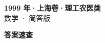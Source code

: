 \documentclass[zihao=-4, a4paper]{ctexart}
\begin{document}
\begin{center}
  {\Large\bfseries 1999 年·上海卷·理工农医类}\\[4pt]
  {\large 数学 · 简答版}
\end{center}
\medskip
{}

\clearpage
{}
\begin{center}{\Large\bfseries 答案速查}\end{center}
\medskip

\end{document}

